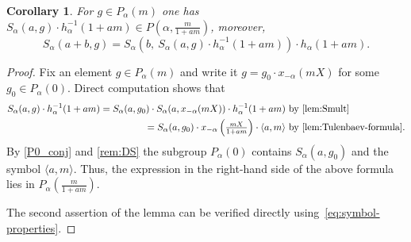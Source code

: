 \documentclass[oneside, 8pt]{amsart}
\newtheorem{corollary}[lemma]{Corollary}
\theoremstyle{remark}
\theoremstyle{definition}
\numberwithin{lemma}{section}
\numberwithin{prop}{section}
\numberwithin{corollary}{section}
\numberwithin{externaltheorem}{section}
\numberwithin{equation}{section}
\begin{document}
\begin{corollary}\label{SR:additivity} For $g \in P_\alpha(m)$ one has $S_\alpha(a, g) \cdot h_\alpha^{-1}(1 + am) \in P(\alpha, \tfrac{m}{1 + am})$, moreover, \[ S_\alpha(a+b, g) = S_\alpha\left(b,\ S_\alpha(a, g) \cdot h_\alpha^{-1}(1 + am)\right)\cdot h_\alpha(1+am). \]\end{corollary} \begin{proof}
Fix an element $g \in P_\alpha(m)$ and write it $g = g_0 \cdot x_{-\alpha}(mX)$ for some $g_0 \in P_\alpha(0)$.
Direct computation shows that
\begin{align*}
 S_\alpha(a, g) \cdot h_{\alpha}^{-1}(1+am) = S_\alpha(a, g_0) \cdot S_\alpha(a, x_{-\alpha}(mX)) \cdot h_{\alpha}^{-1}(1+am)&\text{ by~\cref{lem:Smult}} \\\
 = S_\alpha(a, g_0) \cdot x_{-\alpha}\left(\tfrac{mX}{1+am}\right) \cdot\langle a, m \rangle &\text{ by~\cref{lem:Tulenbaev-formula}.}
\end{align*}
By \cref{P0_conj} and \cref{rem:DS} the subgroup $P_\alpha(0)$ contains $S_\alpha(a, g_0)$ and the symbol $\langle a, m \rangle$. Thus, the expression in the right-hand side of the above formula lies in $P_\alpha\left(\tfrac{m}{1+am}\right)$. 

The second assertion of the lemma can be verified directly using~\eqref{eq:symbol-properties}. \end{proof}
\end{document}
